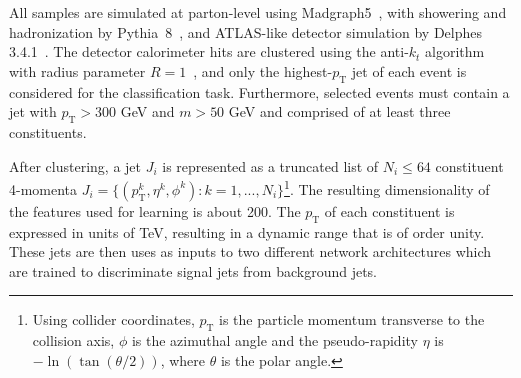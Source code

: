 \documentclass[reprint,nofootinbib,...]{revtex4-1}
\newcommand{\nconst}{64}       %
\newcommand{\JetPtMin}{300}    %
\newcommand{\JetMassMin}{50}   %
\newcommand{\pt}{p_\mathrm{T}} %
\begin{document}
All samples are simulated at parton-level using Madgraph5~\cite{Alwall:2014hca}, with showering and hadronization by Pythia~8~\cite{Sjostrand:2006za,Sjostrand:2007gs}, and ATLAS-like detector simulation by Delphes 3.4.1~\cite{deFavereau:2013fsa}.
The detector calorimeter hits are clustered using the anti-$k_t$ algorithm with radius parameter $R=1$~\cite{Cacciari:2008gp}, and only the highest-$\pt$ jet of each event is considered for the classification task.
Furthermore, selected events must contain a jet with $\pt>\JetPtMin$ GeV and $m>\JetMassMin$ GeV and comprised of at least three constituents.

After clustering, a jet $J_i$ is represented as a truncated list of $N_i\leq\nconst$ constituent 4-momenta $J_i = \{(\pt^k, \eta^k,\phi^k) \colon k = 1,...,N_i\}$\footnote{Using collider coordinates, $\pt$ is the particle momentum transverse to the collision axis, $\phi$ is the azimuthal angle and the pseudo-rapidity $\eta$ is $-\ln(\tan(\theta/2))$, where $\theta$ is the polar angle.}.  The resulting dimensionality of the features used for learning is about 200.
The $\pt$ of each constituent is expressed in units of TeV, resulting in a dynamic range that is of order unity.
These jets are then uses as inputs to two different network architectures which are trained to discriminate signal jets from background jets.

\end{document}
